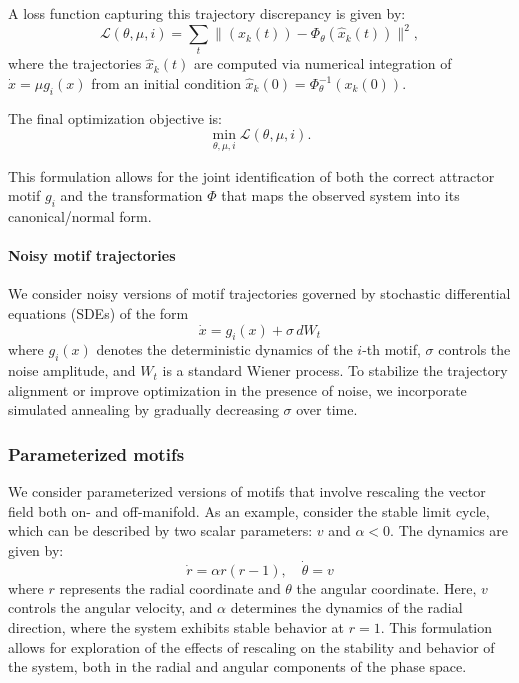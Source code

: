 \documentclass{article}
\theoremstyle{definition} \newtheorem{definition}{Definition}  \newtheorem{example}{Example}
\theoremstyle{remark} \newtheorem{remark}{Remark}
\newcounter{ct}
\begin{document}
A loss function capturing this trajectory discrepancy is given by:
\[
\mathcal{L}(\theta, \mu, i) = \sum_{t} \Big\| (x_k(t)) - \Phi_\theta(\hat{x}_k(t)) \Big\|^2,
\]
where the trajectories \( \hat{x}_k(t) \) are computed via numerical integration of \(\dot x = \mu g_i(x) \) from an initial condition $\hat x_k(0) = \Phi_\theta^{-1}(x_k(0))$.

The final optimization objective is:
\[
\min_{\theta, \mu,  i} \mathcal{L}(\theta, \mu, i). %
\]

This formulation allows for the joint identification of both the correct attractor motif \( g_i \) and the transformation \( \Phi \) that maps the observed system into its canonical/normal form.


\paragraph{Noisy motif trajectories}
We consider noisy versions of motif trajectories governed by stochastic differential equations (SDEs) of the form
\begin{equation}
\dot x = g_i(x) + \sigma \, dW_t
\end{equation}
where \( g_i(x) \) denotes the deterministic dynamics of the \( i \)-th motif, \( \sigma \) controls the noise amplitude, and \( W_t \) is a standard Wiener process.
To stabilize the trajectory alignment or improve optimization in the presence of noise, we incorporate simulated annealing by gradually decreasing \( \sigma \) over time.


\subsubsection{Parameterized motifs}
We consider parameterized versions of motifs that involve rescaling the vector field both on- and off-manifold.
As an example, consider the stable limit cycle, which can be described by two scalar parameters: \( v \) and \( \alpha < 0 \). The dynamics are given by:
\begin{equation}
\dot{r} = \alpha r (r - 1),
\quad \dot{\theta} = v
\end{equation}
where \( r \) represents the radial coordinate and \( \theta \) the angular coordinate. Here, \( v \) controls the angular velocity, and \( \alpha \) determines the dynamics of the radial direction, where the system exhibits stable behavior at \( r = 1 \). This formulation allows for exploration of the effects of rescaling on the stability and behavior of the system, both in the radial and angular components of the phase space.
\end{document}
